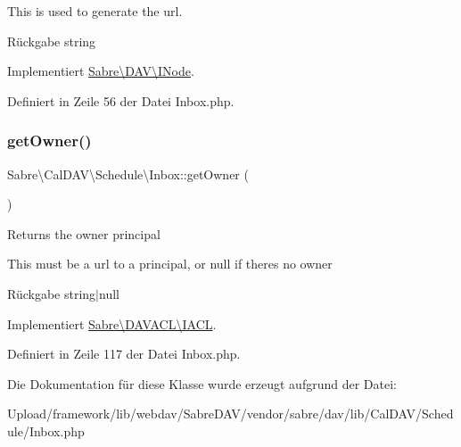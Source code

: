This is used to generate the url.

\begin{DoxyReturn}{Rückgabe}
string 
\end{DoxyReturn}


Implementiert \mbox{\hyperlink{interface_sabre_1_1_d_a_v_1_1_i_node_ab616fe836b1ae36af12126a2bc934dce}{Sabre\textbackslash{}\+D\+A\+V\textbackslash{}\+I\+Node}}.



Definiert in Zeile 56 der Datei Inbox.\+php.

\mbox{\label{class_sabre_1_1_cal_d_a_v_1_1_schedule_1_1_inbox_aaae98d89fe203488407265e19ec7e875}} 
\subsubsection{\texorpdfstring{get\+Owner()}{getOwner()}}
{\footnotesize\ttfamily Sabre\textbackslash{}\+Cal\+D\+A\+V\textbackslash{}\+Schedule\textbackslash{}\+Inbox\+::get\+Owner (\begin{DoxyParamCaption}{ }\end{DoxyParamCaption})}

Returns the owner principal

This must be a url to a principal, or null if there\textquotesingle{}s no owner

\begin{DoxyReturn}{Rückgabe}
string$\vert$null 
\end{DoxyReturn}


Implementiert \mbox{\hyperlink{interface_sabre_1_1_d_a_v_a_c_l_1_1_i_a_c_l_a05f531b4ae1a86eab4e6e95b0413390e}{Sabre\textbackslash{}\+D\+A\+V\+A\+C\+L\textbackslash{}\+I\+A\+CL}}.



Definiert in Zeile 117 der Datei Inbox.\+php.



Die Dokumentation für diese Klasse wurde erzeugt aufgrund der Datei\+:\begin{DoxyCompactItemize}
\item 
Upload/framework/lib/webdav/\+Sabre\+D\+A\+V/vendor/sabre/dav/lib/\+Cal\+D\+A\+V/\+Schedule/Inbox.\+php\end{DoxyCompactItemize}
